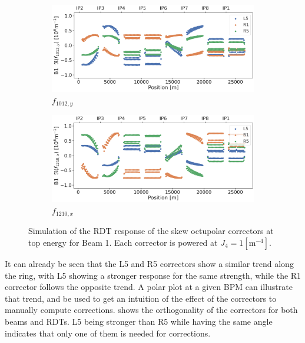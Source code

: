 \begin{figure}[!htb]
    \centering
    \begin{subfigure}{0.8\textwidth}
        \includegraphics[width=\textwidth]{./images/f1012_b1_correctors.pdf}
        \caption{$f_{1012,y}$}
    \end{subfigure}
    \par\bigskip 
    \begin{subfigure}{0.8\textwidth}
        \includegraphics[width=\textwidth]{./images/f1210_b1_correctors.pdf}
        \caption{$f_{1210,x}$}
    \end{subfigure}
    \caption{Simulation of the RDT response of the skew octupolar correctors at top energy for Beam
    1. Each corrector is powered at $J_4 = 1 [\text{m}^{-4}]$.}
    \label{fig:skew_octupolar:response_correctors}
\end{figure}

It can already be seen that the L5 and R5 correctors show a similar trend along the ring, with L5
showing a stronger response for the same strength, while the R1 corrector follows the opposite
trend. A polar plot at a given BPM can illustrate that trend, and be used to get an intuition of the
effect of the correctors to manually compute corrections.
 shows the orthogonality of the correctors for
both beams and RDTs. L5 being stronger than R5 while having the same angle indicates that only one
of them is needed for corrections. 

